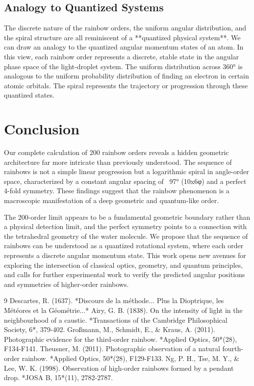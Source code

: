 \documentclass[12pt, twoside]{article}
\begin{document}
\subsection{Analogy to Quantized Systems}
The discrete nature of the rainbow orders, the uniform angular distribution, and the spiral structure are all reminiscent of a **quantized physical system**. We can draw an analogy to the quantized angular momentum states of an atom. In this view, each rainbow order represents a discrete, stable state in the angular phase space of the light-droplet system. The uniform distribution across 360° is analogous to the uniform probability distribution of finding an electron in certain atomic orbitals. The spiral represents the trajectory or progression through these quantized states.

\section{Conclusion}
Our complete calculation of 200 rainbow orders reveals a hidden geometric architecture far more intricate than previously understood. The sequence of rainbows is not a simple linear progression but a logarithmic spiral in angle-order space, characterized by a constant angular spacing of ~97° (10x6φ) and a perfect 4-fold symmetry. These findings suggest that the rainbow phenomenon is a macroscopic manifestation of a deep geometric and quantum-like order.

The 200-order limit appears to be a fundamental geometric boundary rather than a physical detection limit, and the perfect symmetry points to a connection with the tetrahedral geometry of the water molecule. We propose that the sequence of rainbows can be understood as a quantized rotational system, where each order represents a discrete angular momentum state. This work opens new avenues for exploring the intersection of classical optics, geometry, and quantum principles, and calls for further experimental work to verify the predicted angular positions and symmetries of higher-order rainbows.

\begin{thebibliography}{9}
 Descartes, R. (1637). *Discours de la méthode... Plus la Dioptrique, les Météores et la Géométrie...*
 Airy, G. B. (1838). On the intensity of light in the neighbourhood of a caustic. *Transactions of the Cambridge Philosophical Society, 6*, 379-402.
 Großmann, M., Schmidt, E., & Kraus, A. (2011). Photographic evidence for the third-order rainbow. *Applied Optics, 50*(28), F134-F141.
 Theusner, M. (2011). Photographic observation of a natural fourth-order rainbow. *Applied Optics, 50*(28), F129-F133.
 Ng, P. H., Tse, M. Y., & Lee, W. K. (1998). Observation of high-order rainbows formed by a pendant drop. *JOSA B, 15*(11), 2782-2787.

\end{thebibliography}
\end{document}
